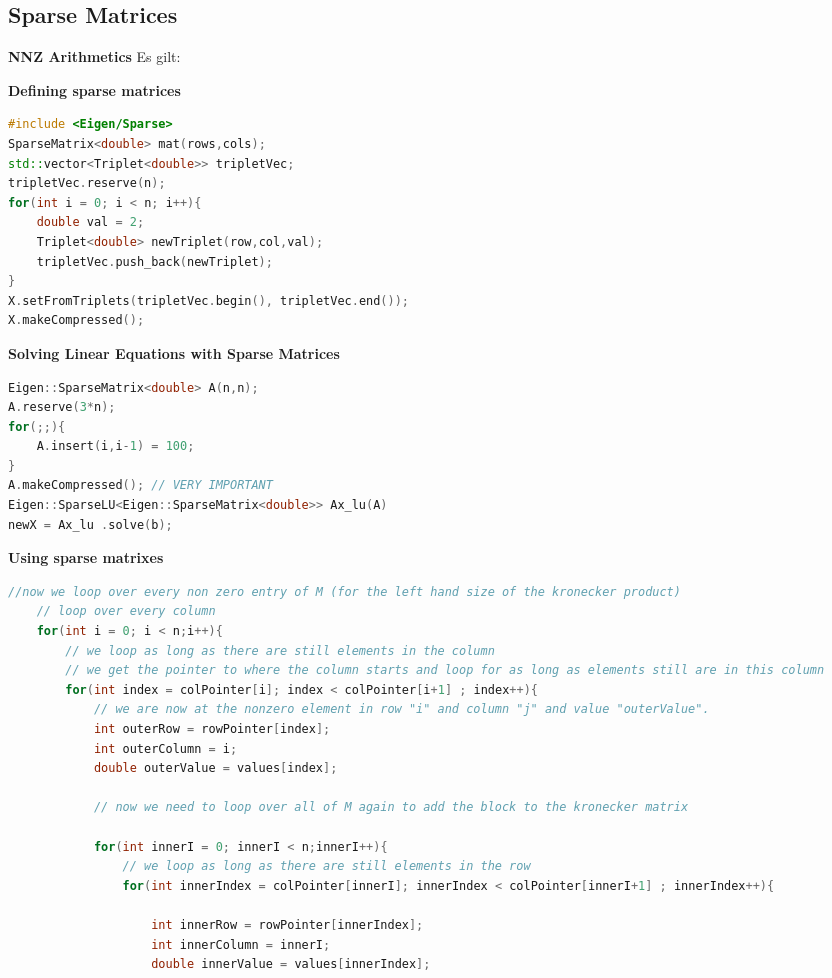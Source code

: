 \documentclass{sciposter}
\newcommand{\TODO}[1]{\todo[inline, color=red!40]{#1}}
\newcommand{\psection}[1]{\par \textbf{\large#1}}
\begin{document}
\begin{multicols}{2}
\section*{Sparse Matrices}

\TODO{nnz arithmetics}
\psection{NNZ Arithmetics}
Es gilt:

\TODO{NNZ arithmetics}

\psection{Defining sparse matrices}
\begin{lstlisting}[language=C++]
#include <Eigen/Sparse>
SparseMatrix<double> mat(rows,cols);
std::vector<Triplet<double>> tripletVec;
tripletVec.reserve(n);
for(int i = 0; i < n; i++){
	double val = 2;
	Triplet<double> newTriplet(row,col,val);
	tripletVec.push_back(newTriplet);
}
X.setFromTriplets(tripletVec.begin(), tripletVec.end());
X.makeCompressed();
\end{lstlisting}



\psection{Solving Linear Equations with Sparse Matrices}
\begin{lstlisting}[language=C++]
Eigen::SparseMatrix<double> A(n,n);
A.reserve(3*n);
for(;;){
	A.insert(i,i-1) = 100;
}
A.makeCompressed(); // VERY IMPORTANT
Eigen::SparseLU<Eigen::SparseMatrix<double>> Ax_lu(A) 
newX = Ax_lu .solve(b);
\end{lstlisting}


\psection{Using sparse matrixes}
\begin{lstlisting}[language=c++]
	//now we loop over every non zero entry of M (for the left hand size of the kronecker product)
	// loop over every column
	for(int i = 0; i < n;i++){
		// we loop as long as there are still elements in the column
		// we get the pointer to where the column starts and loop for as long as elements still are in this column
		for(int index = colPointer[i]; index < colPointer[i+1] ; index++){
			// we are now at the nonzero element in row "i" and column "j" and value "outerValue".
			int outerRow = rowPointer[index];
			int outerColumn = i;
			double outerValue = values[index];
			
			// now we need to loop over all of M again to add the block to the kronecker matrix
			
			for(int innerI = 0; innerI < n;innerI++){
				// we loop as long as there are still elements in the row
				for(int innerIndex = colPointer[innerI]; innerIndex < colPointer[innerI+1] ; innerIndex++){
					
					int innerRow = rowPointer[innerIndex];
					int innerColumn = innerI;
					double innerValue = values[innerIndex];
					

\end{lstlisting}
\end{multicols}
\end{document}

